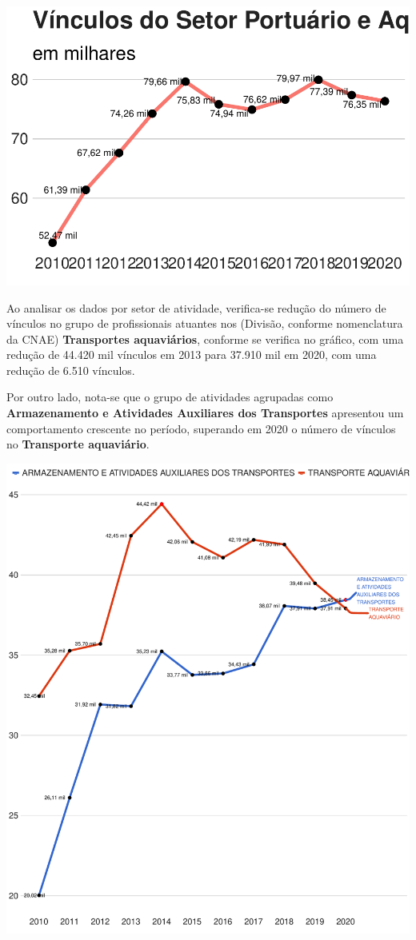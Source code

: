 \documentclass[
]{article}
\begin{document}
\includegraphics{mercado_trabalho_files/figure-latex/g_secao-1.pdf}

Ao analisar os dados por setor de atividade, verifica-se redução do
número de vínculos no grupo de profissionais atuantes nos (Divisão,
conforme nomenclatura da CNAE) \textbf{Transportes aquaviários},
conforme se verifica no gráfico, com uma redução de 44.420 mil vínculos
em 2013 para 37.910 mil em 2020, com uma redução de 6.510 vínculos.

Por outro lado, nota-se que o grupo de atividades agrupadas como
\textbf{Armazenamento e Atividades Auxiliares dos Transportes}
apresentou um comportamento crescente no período, superando em 2020 o
número de vínculos no \textbf{Transporte aquaviário}.

\includegraphics{mercado_trabalho_files/figure-latex/g_divisao-1.pdf}
\end{document}
